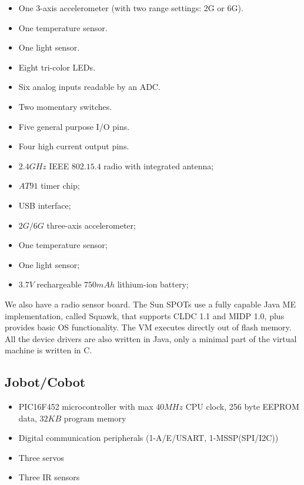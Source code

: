 \documentclass[a4paper,10pt]{article} %
\begin{document}
\begin{itemize}
    \item One 3-axis accelerometer (with two range settings: 2G or 6G).
    \item One temperature sensor.
    \item One light sensor.
    \item Eight tri-color LEDs.
    \item Six analog inputs readable by an ADC.
    \item Two momentary switches.
    \item Five general purpose I/O pins.
    \item Four high current output pins.
    \item $2.4 GHz$ IEEE $802.15.4$ radio with integrated antenna;
    \item $AT91$ timer chip;
    \item USB interface;
    \item $2G/6G$ three-axis accelerometer;
    \item One temperature sensor;
    \item One light sensor;
    \item $3.7V$ rechargeable $750 mAh$ lithium-ion battery;
\end{itemize}

We also have a radio sensor board. The Sun SPOTs use a fully capable Java ME
implementation, called Squawk, that supports CLDC 1.1 and MIDP 1.0, plus
provides basic OS functionality. The VM executes directly out of flash memory.
All the device drivers are also written in Java, only a minimal part of the
virtual machine is written in C.


\subsection{Jobot/Cobot} %
\label{app:cobot}

\begin{itemize}
    \item PIC16F452 microcontroller with max $40MHz$ CPU clock, 256 byte
    EEPROM data, $32KB$ program memory
    \item Digital communication peripherals (1-A/E/USART, 1-MSSP(SPI/I2C))
	\item Three servos
	\item Three IR sensors
\end{itemize}
\end{document}
